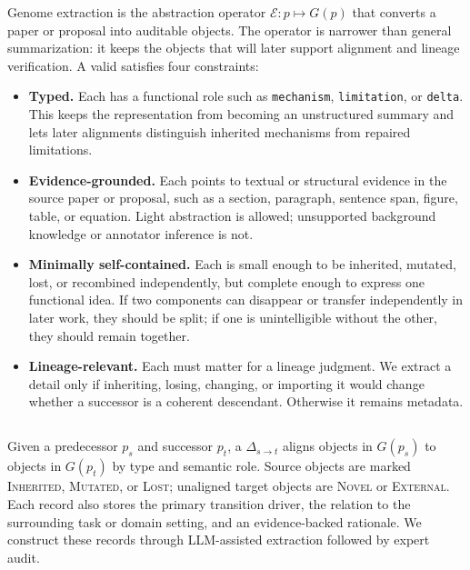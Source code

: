 Genome extraction is the abstraction operator $\mathcal{E}: p \mapsto G(p)$ that converts a paper or proposal into auditable \genome{} objects. The operator is narrower than general summarization: it keeps the objects that will later support \genomediff{} alignment and lineage verification. A valid \genome{} satisfies four constraints:

\begin{itemize}[noitemsep,topsep=2pt,leftmargin=1.2em]
\item \textbf{Typed.} Each \genome{} has a functional role such as \texttt{mechanism}, \texttt{limitation}, or \texttt{delta}. This keeps the representation from becoming an unstructured summary and lets later alignments distinguish inherited mechanisms from repaired limitations.
\item \textbf{Evidence-grounded.} Each \genome{} points to textual or structural evidence in the source paper or proposal, such as a section, paragraph, sentence span, figure, table, or equation. Light abstraction is allowed; unsupported background knowledge or annotator inference is not.
\item \textbf{Minimally self-contained.} Each \genome{} is small enough to be inherited, mutated, lost, or recombined independently, but complete enough to express one functional idea. If two components can disappear or transfer independently in later work, they should be split; if one is unintelligible without the other, they should remain together.
\item \textbf{Lineage-relevant.} Each \genome{} must matter for a lineage judgment. We extract a detail only if inheriting, losing, changing, or importing it would change whether a successor is a coherent descendant. Otherwise it remains metadata.
\end{itemize}

\subsection{\genomediff{}}
\label{sec:genomediff}

Given a predecessor $p_s$ and successor $p_t$, a \textbf{\genomediff{}} $\Delta_{s\to t}$ aligns \genome{} objects in $G(p_s)$ to \genome{} objects in $G(p_t)$ by type and semantic role. Source objects are marked \textsc{Inherited}, \textsc{Mutated}, or \textsc{Lost}; unaligned target objects are \textsc{Novel} or \textsc{External}. Each \genomediff{} record also stores the primary transition driver, the relation to the surrounding task or domain setting, and an evidence-backed rationale. We construct these records through LLM-assisted extraction followed by expert audit.

